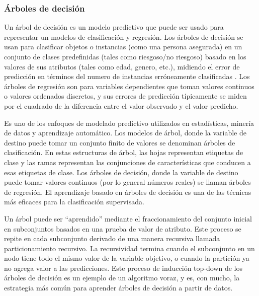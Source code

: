 \subsubsection{Árboles de decisión}
Un árbol de decisión es un modelo predictivo que puede ser usado para representar un modelos de clasificación y regresión. 
Los árboles de decisión se usan para clasificar objetos o instancias (como una persona asegurada) en un conjunto de clases predefinidas (tales como riesgoso/no riesgoso) basado en los valores de sus atributos (tales como edad, genero, etc.), midiendo el error de predicción en términos del numero de instancias erróneamente clasificadas \cite{RokachLiorMaimonDataMiningDecisionTrees}.
Los árboles de regresión son para variables dependientes que toman valores continuos o valores ordenados discretos, y sus errores de predicción típicamente se miden por el cuadrado de la diferencia entre el valor observado y el valor predicho. \cite{LohWei-YinClassificationAndRegressionTrees}


Es uno de los enfoques de modelado predictivo utilizados en estadísticas, minería de datos y aprendizaje automático. 
Los modelos de árbol, donde la variable de destino puede tomar un conjunto finito de valores se denominan árboles de clasificación. 
En estas estructuras de árbol, las hojas representan etiquetas de clase y las ramas representan las conjunciones de características que conducen a esas etiquetas de clase. 
Los árboles de decisión, donde la variable de destino puede tomar valores continuos (por lo general números reales) se llaman árboles de regresión. El aprendizaje basado en árboles de decisión es una de las técnicas más eficaces para la clasificación supervisada.

Un árbol puede ser ``aprendido'' mediante el fraccionamiento del conjunto inicial en subconjuntos basados en una prueba de valor de atributo. 
Este proceso se repite en cada subconjunto derivado de una manera recursiva llamada particionamiento recursivo. 
La recursividad termina cuando el subconjunto en un nodo tiene todo el mismo valor de la variable objetivo, o cuando la partición ya no agrega valor a las predicciones. 
Este proceso de inducción top-down de los árboles de decisión \cite{InductionofDecisionTrees1986}
es un ejemplo de un algoritmo voraz, y es, con mucho, la estrategia más común para aprender árboles de decisión a partir de datos.

